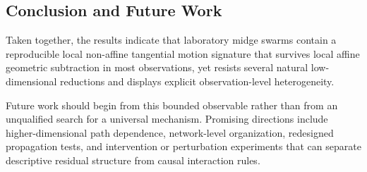 \subsection{Conclusion and Future Work}

Taken together, the results indicate that laboratory midge swarms contain a
reproducible local non-affine tangential motion signature that survives local
affine geometric subtraction in most observations, yet resists several natural
low-dimensional reductions and displays explicit observation-level
heterogeneity.

Future work should begin from this bounded observable rather than from an
unqualified search for a universal mechanism. Promising directions include
higher-dimensional path dependence, network-level organization, redesigned
propagation tests, and intervention or perturbation experiments that can
separate descriptive residual structure from causal interaction rules.

